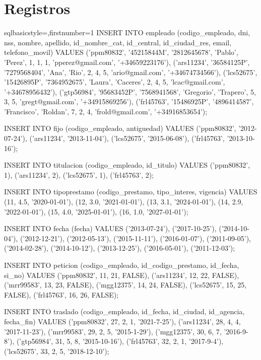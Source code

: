 \section{Registros}
\begin{sourcecodep}[]{sql}{basicstyle={\fontsize{10}{10}\selectfont\ttfamily},firstnumber=1}{}
	INSERT INTO empleado (codigo_empleado, dni, nss, nombre, apellido, id_nombre_cat, id_central, id_ciudad_res, email, telefono_movil)
	VALUES 
		('ppm80832', '45215844M', '2812645678', 'Pablo', 'Perez', 1, 1, 1, 'pperez@gmail.com', '+34659223176'),
		('ars11234', '36584125P', '7279568404', 'Ana', 'Rio', 2, 4, 5, 'ario@gmail.com', '+34674734566'),
		('lcs52675', '15426895P', '7364952675', 'Laura', 'Caceres', 2, 4, 5, 'lcac@gmail.com', '+34678956432'),
		('gtp56984', '95683452P', '7568941568', 'Gregorio', 'Trapero', 5, 3, 5, 'gregt@gmail.com', '+34915869256'),
		('frl45763', '15486925P', '4896414587', 'Francisco', 'Roldan', 7, 2, 4, 'frold@gmail.com', '+34916853654');
	
	INSERT INTO fijo (codigo_empleado, antiguedad)
	VALUES 
		('ppm80832', '2012-07-24'),
		('ars11234', '2013-11-04'),
		('lcs52675', '2015-06-08'),
		('frl45763', '2013-10-16');
	
	INSERT INTO titulacion (codigo_empleado, id_titulo)
	VALUES 
		('ppm80832', 1),
		('ars11234', 2),
		('lcs52675', 1),
		('frl45763', 2);
	
	INSERT INTO tipoprestamo (codigo_prestamo, tipo_interes, vigencia)
	VALUES
		(11, 4.5, '2020-01-01'),
		(12, 3.0, '2021-01-01'),
		(13, 3.1, '2024-01-01'),
		(14, 2.9, '2022-01-01'),
		(15, 4.0, '2025-01-01'),
		(16, 1.0, '2027-01-01');
	
	INSERT INTO fecha (fecha)
	VALUES 
		('2013-07-24'),
		('2017-10-25'),
		('2014-10-04'),
		('2012-12-21'),
		('2012-05-13'),
		('2015-11-11'),
		('2016-01-07'),
		('2011-09-05'),
		('2014-02-28'),
		('2014-10-12'),
		('2013-12-25'),
		('2016-05-01'),
		('2011-12-03');
	
	INSERT INTO peticion (codigo_empleado, id_codigo_prestamo, id_fecha, si_no)
	VALUES
		('ppm80832', 11, 21, FALSE),
		('ars11234', 12, 22, FALSE),
		('mrr99583', 13, 23, FALSE),
		('mgg12375', 14, 24, FALSE),
		('lcs52675', 15, 25, FALSE),
		('frl45763', 16, 26, FALSE);
	
	INSERT INTO traslado (codigo_empleado, id_fecha, id_ciudad, id_agencia, fecha_fin)
	VALUES
		('ppm80832', 27, 2, 1, '2021-7-25'),
		('ars11234', 28, 4, 4, '2017-11-23'),
		('mrr99583', 29, 2, 5, '2015-1-29'),
		('mgg12375', 30, 6, 7, '2016-9-8'),
		('gtp56984', 31, 5, 8, '2015-10-16'),
		('frl45763', 32, 2, 1, '2017-9-4'),
		('lcs52675', 33, 2, 5, '2018-12-10');\end{sourcecodep}
\newpage

